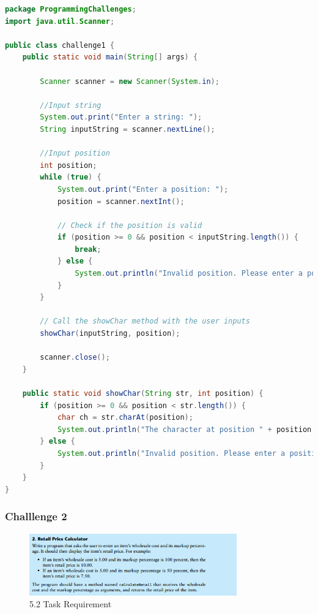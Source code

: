 \documentclass{article}
\begin{document}
\begin{lstlisting}[language=Java, caption=Challenge1.java]
package ProgrammingChallenges;
import java.util.Scanner;

public class challenge1 {
    public static void main(String[] args) {

        Scanner scanner = new Scanner(System.in);

        //Input string
        System.out.print("Enter a string: ");
        String inputString = scanner.nextLine();

        //Input position
        int position;
        while (true) {
            System.out.print("Enter a position: ");
            position = scanner.nextInt();

            // Check if the position is valid
            if (position >= 0 && position < inputString.length()) {
                break;
            } else {
                System.out.println("Invalid position. Please enter a position between 0 and " + (inputString.length() - 1));
            }
        }

        // Call the showChar method with the user inputs
        showChar(inputString, position);

        scanner.close();
    }

    public static void showChar(String str, int position) {
        if (position >= 0 && position < str.length()) {
            char ch = str.charAt(position);
            System.out.println("The character at position " + position + " is " + ch);
        } else {
            System.out.println("Invalid position. Please enter a position between 0 and " + (str.length() - 1));
        }
    }
}
\end{lstlisting}

\subsubsection*{Challlenge 2}
\begin{figure}[H]
    \centering
    \includegraphics[width=0.8\textwidth]{./Assets/Task requirements/Assignment5/5.2.png}
    \caption{5.2 Task Requirement}
\end{figure}
\end{document}
